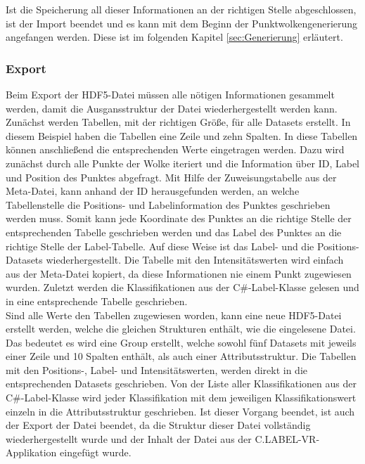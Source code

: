 Ist die Speicherung all dieser Informationen an der richtigen Stelle abgeschlossen, ist der Import beendet und es kann mit dem Beginn der Punktwolkengenerierung angefangen werden. Diese ist im folgenden Kapitel \ref{sec:Generierung} erläutert.


\subsubsection{Export}

Beim Export der HDF5-Datei müssen alle nötigen Informationen gesammelt werden, damit die Ausgansstruktur der Datei wiederhergestellt werden kann. Zunächst werden Tabellen, mit der richtigen Größe, für alle Datasets erstellt. In diesem Beispiel haben die Tabellen eine Zeile und zehn Spalten. In diese Tabellen können anschließend die entsprechenden Werte eingetragen werden. Dazu wird zunächst durch alle Punkte der Wolke iteriert und die Information über ID, Label und Position des Punktes abgefragt. Mit Hilfe der Zuweisungstabelle aus der Meta-Datei, kann anhand der ID herausgefunden werden, an welche Tabellenstelle die Positions- und Labelinformation des Punktes geschrieben werden muss. Somit kann jede Koordinate des Punktes an die richtige Stelle der entsprechenden Tabelle geschrieben werden und das Label des Punktes an die richtige Stelle der Label-Tabelle. Auf diese Weise ist das Label- und die Positions-Datasets wiederhergestellt. Die Tabelle mit den Intensitätswerten wird einfach aus der Meta-Datei kopiert, da diese Informationen nie einem Punkt zugewiesen wurden. Zuletzt werden die Klassifikationen aus der C\#{}-Label-Klasse gelesen und in eine entsprechende Tabelle geschrieben. \\

Sind alle Werte den Tabellen zugewiesen worden, kann eine neue HDF5-Datei erstellt werden, welche die gleichen Strukturen enthält, wie die eingelesene Datei. Das bedeutet es wird eine Group erstellt, welche sowohl fünf Datasets mit jeweils einer Zeile und 10 Spalten enthält, als auch einer Attributsstruktur. Die Tabellen mit den Positions-, Label- und Intensitätswerten, werden direkt in die entsprechenden Datasets geschrieben. Von der Liste aller Klassifikationen aus der C\#{}-Label-Klasse wird jeder Klassifikation mit dem jeweiligen Klassifikationswert einzeln in die Attributsstruktur geschrieben. Ist dieser Vorgang beendet, ist auch der Export der Datei beendet, da die Struktur dieser Datei vollständig wiederhergestellt wurde und der Inhalt der Datei aus der C.LABEL-VR-Applikation eingefügt wurde. 

